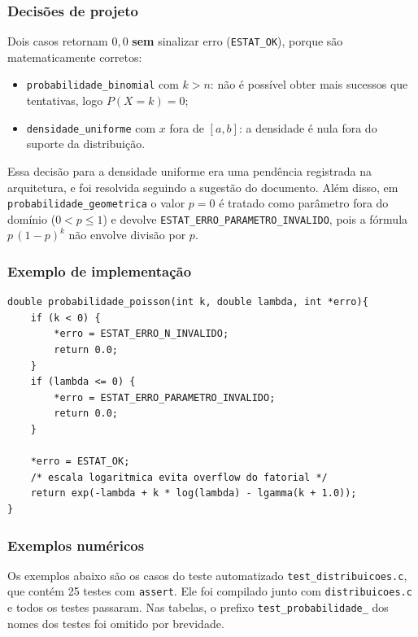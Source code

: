 \documentclass[12pt,a4paper]{article}
\newcommand{\cod}[1]{\texttt{#1}}
\begin{document}
\subsubsection{Decisões de projeto}
Dois casos retornam $0{,}0$ \textbf{sem} sinalizar erro (\cod{ESTAT\_OK}),
porque são matematicamente corretos:
\begin{itemize}
  \item \cod{probabilidade\_binomial} com $k > n$: não é possível obter mais
        sucessos que tentativas, logo $P(X = k) = 0$;
  \item \cod{densidade\_uniforme} com $x$ fora de $[a, b]$: a densidade é nula
        fora do suporte da distribuição.
\end{itemize}
Essa decisão para a densidade uniforme era uma pendência registrada na
arquitetura, e foi resolvida seguindo a sugestão do documento.
Além disso, em \cod{probabilidade\_geometrica} o valor $p = 0$ é tratado como
parâmetro fora do domínio ($0 < p \le 1$) e devolve
\cod{ESTAT\_ERRO\_PARAMETRO\_INVALIDO}, pois a fórmula
$p\,(1-p)^{k}$ não envolve divisão por $p$.
 
\subsubsection{Exemplo de implementação}
\begin{lstlisting}
double probabilidade_poisson(int k, double lambda, int *erro){
    if (k < 0) {
        *erro = ESTAT_ERRO_N_INVALIDO;
        return 0.0;
    }
    if (lambda <= 0) {
        *erro = ESTAT_ERRO_PARAMETRO_INVALIDO;
        return 0.0;
    }
 
    *erro = ESTAT_OK;
    /* escala logaritmica evita overflow do fatorial */
    return exp(-lambda + k * log(lambda) - lgamma(k + 1.0));
}
\end{lstlisting}
 
\subsubsection{Exemplos numéricos}
Os exemplos abaixo são os casos do teste automatizado
\cod{test\_distribuicoes.c}, que contém 25 testes com \cod{assert}. Ele foi
compilado junto com \cod{distribuicoes.c} e todos os testes passaram. Nas
tabelas, o prefixo \cod{test\_probabilidade\_} dos nomes dos testes foi omitido
por brevidade.
\end{document}
